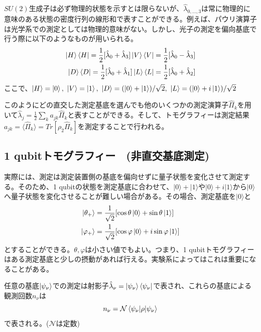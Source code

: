 \documentclass[11pt,a4j,notitlepage]{jreport}
\begin{document}
	$SU(2)$生成子は必ず物理的状態を示すとは限らないが、$\hat{\lambda}_{0,...,3}$は常に物理的に意味のある状態の密度行列の線形和で表すことができる。例えば、パウリ演算子は光学系での測定としては物理的意味がない。しかし、光子の測定を偏向基底で行う際に以下のようなものが用いられる。
	\begin{equation}
		\begin{aligned}
			\ket{H} \bra{H} = \frac{1}{2}[\hat{\lambda}_0 + \hat{\lambda}_3] \ket{V} \bra{V} = \frac{1}{2}[\hat{\lambda}_0 - \hat{\lambda}_3]\\
			\ket{D} \bra{D} = \frac{1}{2}[\hat{\lambda}_0 + \hat{\lambda}_1] \ket{L} \bra{L} = \frac{1}{2}[\hat{\lambda}_0 + \hat{\lambda}_2]
		\end{aligned}
	\end{equation}
	ここで、$\ket{H} = \ket{0}, \ \ket{V} = \ket{1}, \ \ket{D} = (\ket{0} + \ket{1}) / \sqrt{2} , \ \ket{L} = (\ket{0} + i\ket{1}) / \sqrt{2}$

	このようにどの直交した測定基底を選んでも他のいくつかの測定演算子$\hat{\Pi}_k$を用いて$\hat{\lambda}_j = \frac{1}{2} \sum_{k} a_{jk} \hat{\Pi}_k$と表すことができる。そして、トモグラフィーは測定結果$a_{jk} = \langle \hat{\Pi}_k \rangle = Tr[\rho_2 \hat{\Pi}_k]$を測定することで行われる。

	\subsection{1 qubitトモグラフィー　(非直交基底測定)}

	実際には、測定は測定装置側の基底を偏向せずに量子状態を変化させて測定する。そのため、1 qubitの状態を測定基底に合わせて、$| 0 \rangle + | 1 \rangle$や$| 0 \rangle + i | 1 \rangle$から$| 0 \rangle$へ量子状態を変化させることが難しい場合がある。その場合、測定基底を$| 0 \rangle$と
	\begin{equation}
		\begin{aligned}
			\ket{\theta_+} &= \frac{1}{\sqrt{2}} [\cos \theta \ket{0} + \sin \theta \ket{1}]\\
			\ket{\varphi_+} &= \frac{1}{\sqrt{2}} [\cos \varphi \ket{0} + i \sin \varphi \ket{1}]
		\end{aligned}
	\end{equation}
	とすることができる。$\theta, \varphi$は小さい値でもよい。つまり、1 qubitトモグラフィーはある測定基底と少しの摂動があれば行える。実験系によってはこれは重要になることがある。

	任意の基底$\ket{\psi_\nu}$での測定は射影子$\hat{\lambda}_\nu = \ket{\psi_\nu} \bra{\psi_\nu}$で表され、これらの基底による観測回数$n_\nu$は
	\begin{equation}
		n_\nu = \mathcal{N} \braket{\psi_\nu | \rho | \psi_\nu}
	\end{equation}
	で表される。($\mathcal{N}$は定数)
\end{document}
